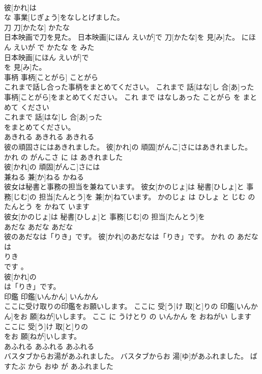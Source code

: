 \documentclass[8pt]{extreport}
\begin{document}
\begin{CJK}{UTF8}{min}
\\	彼[かれ]は
\\	な 事業[じぎょう]をなしとげました。			
\\	刀	刀[かたな]	かたな	
\\	日本映画で刀を見た。	日本映画[にほん えいが]で 刀[かたな]を 見[み]た。	にほん えいが で かたな を みた	
\\	日本映画[にほん えいが]で
\\	を 見[み]た。			
\\	事柄	事柄[ことがら]	ことがら	
\\	これまで話し合った事柄をまとめてください。	これまで 話[はな]し 合[あ]った 事柄[ことがら]をまとめてください。	これ まで はなしあった ことがら を まとめて ください	
\\	これまで 話[はな]し 合[あ]った
\\	をまとめてください。			
\\	あきれる	あきれる	あきれる	
\\	彼の頑固さにはあきれました。	彼[かれ]の 頑固[がんこ]さにはあきれました。	かれ の がんこさ に は あきれました	
\\	彼[かれ]の 頑固[がんこ]さには
\\	兼ねる	兼[か]ねる	かねる	
\\	彼女は秘書と事務の担当を兼ねています。	彼女[かのじょ]は 秘書[ひしょ]と 事務[じむ]の 担当[たんとう]を 兼[か]ねています。	かのじょ は ひしょ と じむ の たんとう を かねて います	
\\	彼女[かのじょ]は 秘書[ひしょ]と 事務[じむ]の 担当[たんとう]を
\\	あだな	あだな	あだな	
\\	彼のあだなは「りき」です。	彼[かれ]のあだなは「りき」です。	かれ の あだな は 
\\	りき 
\\	です 。	
\\	彼[かれ]の
\\	は「りき」です。			
\\	印鑑	印鑑[いんかん]	いんかん	
\\	ここに受け取りの印鑑をお願いします。	ここに 受[う]け 取[と]りの 印鑑[いんかん]をお 願[ねが]いします。	ここ に うけとり の いんかん を おねがい します	
\\	ここに 受[う]け 取[と]りの
\\	をお 願[ねが]いします。			
\\	あふれる	あふれる	あふれる	
\\	バスタブからお湯があふれました。	バスタブからお 湯[ゆ]があふれました。	ばすたぶ から おゆ が あふれました	

\end{CJK}
\end{document}
